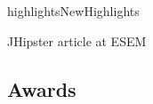 \documentclass{ra2018}
\begin{document}

\begin{module}{highlights}{NewHighlights}{}


JHipster article at ESEM~\cite{halin:hal-01829928}

\subsection{Awards}


\end{module}

\end{document}
